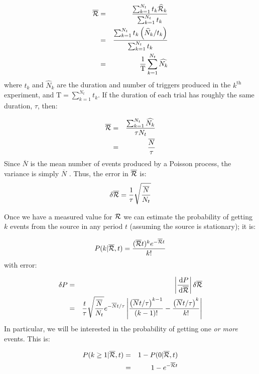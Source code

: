 \begin{eqnarray}
\label{eqn:avg_rate_param}
\overline{\RP} & = & \frac{\sum_{k=1}^{N_t} t_k \widehat{\RP}_k}{\sum_{k=1}^{N_t} t_k} \nonumber \\
 & = & \frac{\sum_{k=1}^{N_t} t_k \left(\widehat{N}_k/t_k\right)}{\sum_{k=1}^{N_t} t_k} \nonumber \\
 & = & \frac{1}{\mathrm{T}}\sum_{k=1}^{N_t} \widehat{N_k}
 \end{eqnarray}
where $t_k$ and $\widehat{N}_k$ are the duration and number of triggers produced in the $k^{\mathrm{th}}$ experiment, and $\mathrm{T} = \sum_{k=1}^{N_t} t_k$. If the duration of each trial has roughly the same duration, $\tau$, then:

\begin{eqnarray}
\overline{\mathcal{R}} & = & \frac{\sum_{k=1}^{N_t} \widehat{N_k}}{\tau N_t} \\
 & = & \frac{\overline{N}}{\tau}
 \end{eqnarray}
Since $\overline{N}$ is the mean number of events produced by a Poisson process, the variance is simply $\overline{N}$ \cite{ref:Poisson}. Thus, the error in $\overline{\mathcal{R}}$ is:
\begin{equation}
\label{eqn:err_R}
\delta \overline{\RP} = \frac{1}{\tau}\sqrt{\frac{\overline{N}}{N_t}}
\end{equation}

Once we have a measured value for $\mathcal{R}$ we can estimate the probability of getting $k$ events from the source in any period $t$ (assuming the source is stationary); it is:

\begin{equation}
\label{eqn:prob_Rt}
P(k|\overline{\RP},t) = \frac{(\overline{\RP} t)^k e^{-\overline{\RP} t}}{k!}
\end{equation}
with error:

\begin{eqnarray}
\label{eqn:err_rate_param}
\delta P & = & \left| \frac{\d{P}}{\d{\overline{\RP}}} \right| \delta \overline{\RP} \nonumber \\
         & = & \frac{t}{\tau}\sqrt{\frac{\overline{N}}{N_t}} e^{-\overline{N}t/\tau} \left| \frac{\left(\overline{N}t/\tau \right)^{k-1}}{\left( k-1 \right)!} - \frac{\left(\overline{N}t/\tau \right)^{k}}{k!} \right|
\end{eqnarray}
In particular, we will be interested in the probability of getting one \emph{or more} events. This is:

\begin{eqnarray}
\label{eqn:one_or_more}
P(k\geq1 | \overline{\RP},t) & = & 1 - P(0 | \overline{\RP},t) \nonumber \\
 & = & 1 - e^{-\overline{\RP}t}
 \end{eqnarray}

